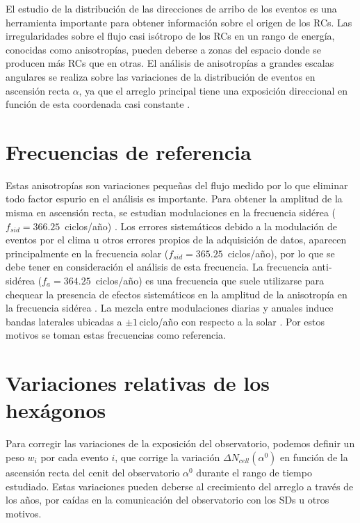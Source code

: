 El estudio de la distribución de las direcciones de arribo de los eventos es una herramienta importante para obtener información sobre el origen de los RCs. Las irregularidades sobre el flujo casi isótropo de los RCs en un rango de energía, conocidas como anisotropías, pueden deberse a zonas del espacio donde se producen más RCs que en otras. El análisis de anisotropías a grandes escalas angulares se realiza sobre las variaciones de la distribución de eventos en ascensión recta $\alpha$, ya que el arreglo principal tiene una exposición direccional en función de esta coordenada casi constante \cite{referencia_anis}.

\section{Frecuencias de referencia}

Estas anisotropías son variaciones pequeñas del flujo medido por lo que eliminar todo factor espurio en el análisis es importante. Para obtener la amplitud de la misma en ascensión recta, se estudian modulaciones en la frecuencia sidérea ($f_{sid}=366.25\,$ ciclos/año) \cite{taborda}. Los errores sistemáticos debido a la modulación de eventos por el clima u otros errores propios de la adquisición de datos, aparecen principalmente en la frecuencia solar  ($f_{sid}=365.25\,$ ciclos/año), por lo que se debe tener en consideración el análisis de esta frecuencia. La frecuencia anti-sidérea ($f_a=364.25\,$ ciclos/año) es una frecuencia que suele utilizarse para chequear la presencia de efectos sistemáticos en la amplitud de la anisotropía en la frecuencia sidérea \cite{farley1954sidereal}. La mezcla entre modulaciones diarias y anuales induce bandas laterales ubicadas a $\pm1\,$ciclo/año con respecto a la solar \cite{taborda}. Por estos motivos se toman estas frecuencias  como referencia.

\section{Variaciones relativas de los hexágonos} \label{peso_hexagonos}

Para corregir las variaciones de la exposición del observatorio, podemos definir un peso  $w_i$ por cada evento $i$, que corrige la variación  $\Delta N_{cell}(\alpha^0)$ en función de la ascensión recta del cenit del observatorio $\alpha^0$ durante el rango de tiempo estudiado. Estas variaciones pueden deberse al crecimiento del arreglo a través de los años,  por caídas en la comunicación del observatorio con los SDs u otros motivos. 

